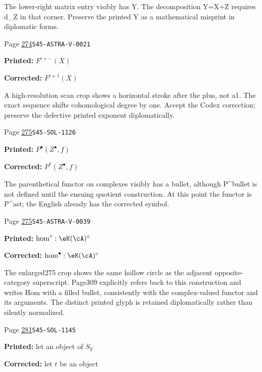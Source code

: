\begin{description}
\par\noindent The lower-right matrix entry visibly has Y. The decomposition Y=X+Z requires d\_Z in that corner. Preserve the printed Y as a mathematical misprint in diplomatic forms.
\smallskip
\item[\hypertarget{apparatus:EN-0197}{197}] Page \hyperlink{printpage:en:274}{274}\quad\texttt{S45-ASTRA-V-0021}
\par\noindent\textbf{Printed:} \(F^{i+-}(X)\)
\par\noindent\textbf{Corrected:} \(F^{i+1}(X)\)
\par\noindent A high-resolution scan crop shows a horizontal stroke after the plus, not a1. The exact sequence shifts cohomological degree by one. Accept the Codex correction; preserve the defective printed exponent diplomatically.
\smallskip
\item[\hypertarget{apparatus:EN-0198}{198}] Page \hyperlink{printpage:en:275}{275}\quad\texttt{S45-SOL-1126}
\par\noindent\textbf{Printed:} \(P^\bullet(Z^\bullet,f)\)
\par\noindent\textbf{Corrected:} \(P^\ast(Z^\bullet,f)\)
\par\noindent The parenthetical functor on complexes visibly has a bullet, although P\textasciicircum{}bullet is not defined until the ensuing quotient construction. At this point the functor is P\textasciicircum{}ast; the English already has the corrected symbol.
\smallskip
\item[\hypertarget{apparatus:EN-0199}{199}] Page \hyperlink{printpage:en:275}{275}\quad\texttt{S45-ASTRA-V-0039}
\par\noindent\textbf{Printed:} \(\hom^\circ:\eK(\cA)^\circ\)
\par\noindent\textbf{Corrected:} \(\hom^\bullet:\eK(\cA)^\circ\)
\par\noindent The enlarged275 crop shows the same hollow circle as the adjacent opposite-category superscript. Page309 explicitly refers back to this construction and writes Hom with a filled bullet, consistently with the complex-valued functor and its arguments. The distinct printed glyph is retained diplomatically rather than silently normalized.
\smallskip
\item[\hypertarget{apparatus:EN-0200}{200}] Page \hyperlink{printpage:en:281}{281}\quad\texttt{S45-SOL-1145}
\par\noindent\textbf{Printed:} let an object
    of $S_Y$
\par\noindent\textbf{Corrected:} let $t$ be an object

\end{description}
